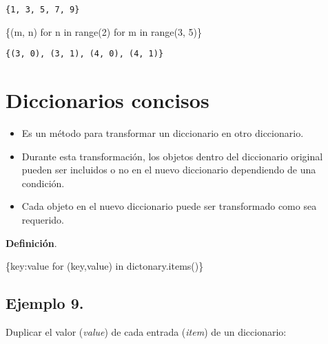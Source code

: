 \documentclass[
  letterpaper,
  DIV=11,
  numbers=noendperiod]{scrreprt}
\newenvironment{Shaded}{\begin{snugshade}}{\end{snugshade}}
\newcommand{\BuiltInTok}[1]{\textcolor[rgb]{0.00,0.23,0.31}{#1}}
\newcommand{\ControlFlowTok}[1]{\textcolor[rgb]{0.00,0.23,0.31}{#1}}
\newcommand{\DecValTok}[1]{\textcolor[rgb]{0.68,0.00,0.00}{#1}}
\newcommand{\KeywordTok}[1]{\textcolor[rgb]{0.00,0.23,0.31}{#1}}
\newcommand{\NormalTok}[1]{\textcolor[rgb]{0.00,0.23,0.31}{#1}}
\begin{document}
\begin{verbatim}
{1, 3, 5, 7, 9}
\end{verbatim}

\begin{Shaded}
\begin{Highlighting}[]
\NormalTok{\{(m, n) }\ControlFlowTok{for}\NormalTok{ n }\KeywordTok{in} \BuiltInTok{range}\NormalTok{(}\DecValTok{2}\NormalTok{) }\ControlFlowTok{for}\NormalTok{ m }\KeywordTok{in} \BuiltInTok{range}\NormalTok{(}\DecValTok{3}\NormalTok{, }\DecValTok{5}\NormalTok{)\}}
\end{Highlighting}
\end{Shaded}

\begin{verbatim}
{(3, 0), (3, 1), (4, 0), (4, 1)}
\end{verbatim}


\chapter{Diccionarios concisos}\label{diccionarios-concisos}

\begin{itemize}
\item
  Es un método para transformar un diccionario en otro diccionario.
\item
  Durante esta transformación, los objetos dentro del diccionario
  original pueden ser incluidos o no en el nuevo diccionario dependiendo
  de una condición.
\item
  Cada objeto en el nuevo diccionario puede ser transformado como sea
  requerido.
\end{itemize}

\textbf{Definición}.

\begin{Shaded}
\begin{Highlighting}[]
\NormalTok{\{key:value }\ControlFlowTok{for}\NormalTok{ (key,value) }\KeywordTok{in}\NormalTok{ dictonary.items()\}}
\end{Highlighting}
\end{Shaded}

\section{\texorpdfstring{\textbf{Ejemplo
9.}}{Ejemplo 9.}}\label{ejemplo-9.-2}

Duplicar el valor (\emph{value}) de cada entrada (\emph{item}) de un
diccionario:
\end{document}

